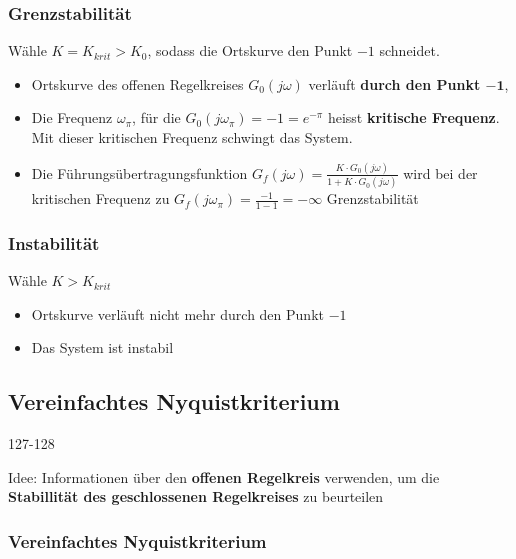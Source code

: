 \subsubsection{Grenzstabilität}

Wähle $K = K_{krit} > K_0$, sodass die Ortskurve den Punkt $-1$ schneidet.
\vspace{0.1cm}
\begin{itemize}
    \item Ortskurve des offenen Regelkreises $G_0(j \omega)$ verläuft \textbf{durch den Punkt $\boldsymbol{-1}$}, 
    \item Die Frequenz $\omega_{\pi}$, für die $G_0(j \omega_{\pi})= -1 = e^{- \pi}$ heisst \textbf{kritische Frequenz}. Mit dieser 
        kritischen Frequenz schwingt das System.
    \item Die Führungsübertragungsfunktion $G_f(j \omega) = \frac { K \cdot G_0(j \omega)}{1 + K \cdot G_0(j \omega)}$ wird bei 
    der kritischen Frequenz zu $G_f(j \omega_{\pi}) = \frac{-1}{1-1} = - \infty $ \textrightarrow Grenzstabilität
\end{itemize}


\subsubsection{Instabilität}

Wähle $K > K_{krit}$
\vspace{0.1cm}
\begin{itemize}
    \item Ortskurve verläuft nicht mehr durch den Punkt $-1$
    \item Das System ist instabil
\end{itemize}


\subsection{Vereinfachtes Nyquistkriterium}{127-128}

Idee: Informationen über den \textbf{offenen Regelkreis} verwenden, um die \textbf{Stabillität des geschlossenen Regelkreises} 
zu beurteilen



\subsubsection{Vereinfachtes Nyquistkriterium}

